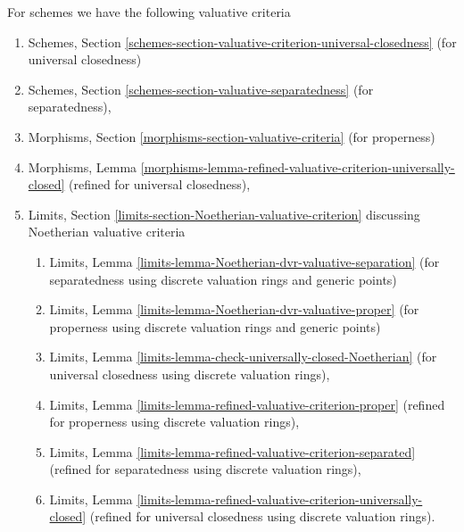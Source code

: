 \medskip\noindent
For schemes we have the following valuative criteria
\begin{enumerate}
\item Schemes, Section
\ref{schemes-section-valuative-criterion-universal-closedness}
(for universal closedness)
\item Schemes, Section \ref{schemes-section-valuative-separatedness}
(for separatedness),
\item Morphisms, Section \ref{morphisms-section-valuative-criteria}
(for properness)
\item Morphisms, Lemma
\ref{morphisms-lemma-refined-valuative-criterion-universally-closed}
(refined for universal closedness),
\item Limits, Section \ref{limits-section-Noetherian-valuative-criterion}
discussing Noetherian valuative criteria
\begin{enumerate}
\item Limits, Lemma \ref{limits-lemma-Noetherian-dvr-valuative-separation}
(for separatedness using discrete valuation rings and generic points)
\item Limits, Lemma \ref{limits-lemma-Noetherian-dvr-valuative-proper}
(for properness using discrete valuation rings and generic points)
\item Limits, Lemma \ref{limits-lemma-check-universally-closed-Noetherian}
(for universal closedness using discrete valuation rings),
\item Limits, Lemma \ref{limits-lemma-refined-valuative-criterion-proper}
(refined for properness using discrete valuation rings),
\item Limits, Lemma \ref{limits-lemma-refined-valuative-criterion-separated}
(refined for separatedness using discrete valuation rings),
\item Limits, Lemma
\ref{limits-lemma-refined-valuative-criterion-universally-closed}
(refined for universal closedness using discrete valuation rings).
\end{enumerate}
\end{enumerate}

















